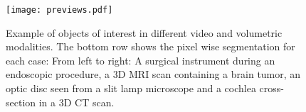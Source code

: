 \begin{figure}[t!]
\centering
\texttt{[image: previews.pdf]}
\caption{Example of objects of interest in different video and volumetric modalities. The bottom row shows the pixel wise segmentation for each case: From left to right: A surgical instrument during an endoscopic procedure, a 3D MRI scan containing a brain tumor, an optic disc seen from a slit lamp microscope and a cochlea cross-section in a 3D CT scan.}
\label{fig:dset_previews}
\end{figure}

